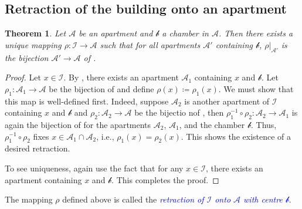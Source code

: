 \documentclass{article}
\theoremstyle{thmstyle}
\newtheorem{theorem}{Theorem}[section]
\theoremstyle{defstyle}
\newcommand{\scrA}{\mathscr{A}}
\newcommand{\scrb}{\mathscr{b}}
\newcommand{\scrI}{\mathscr{I}}
\newcommand{\define}[1]{\textcolor{blue}{\textit{#1}}}
\begin{document}
\subsection{Retraction of the building onto an apartment}
\begin{theorem} 
    Let $\scrA$ be an apartment and $\scrb$ a chamber in $\scrA$. Then there exists a unique mapping $\rho:\scrI\to\scrA$ such that for all apartments $\scrA'$ containing $\scrb$, $\rho|_{\scrA'}$ is the bijection $\scrA'\to\scrA$ of .
\end{theorem}
\begin{proof}
    Let $x\in\scrI$. By , there exists an apartment $\scrA_1$ containing $x$ and $\scrb$. Let $\rho_1: \scrA_1\to\scrA$ be the bijection of  and define $\rho(x)\coloneq\rho_1(x)$. We must show that this map is well-defined first. Indeed, suppose $\scrA_2$ is another apartment of $\scrI$ containing $x$ and $\scrb$ and $\rho_2: \scrA_2\to\scrA$ be the bijectio nof , then $\rho_1^{-1}\circ\rho_2: \scrA_2\to\scrA_1$ is again the bijection of  for the apartments $\scrA_2$, $\scrA_1$, and the chamber $\scrb$. Thus, $\rho_1^{-1}\circ\rho_2$ fixes $x\in\scrA_1\cap\scrA_2$, i.e., $\rho_1(x) = \rho_2(x)$. This shows the existence of a desired retraction. 

    To see uniqueness, again use the fact that for any $x\in\scrI$, there exists an apartment containing $x$ and $\scrb$. This completes the proof.
\end{proof}

The mapping $\rho$ defined above is called the \define{retraction of $\scrI$ onto $\scrA$ with centre $\scrb$}.
\end{document}
